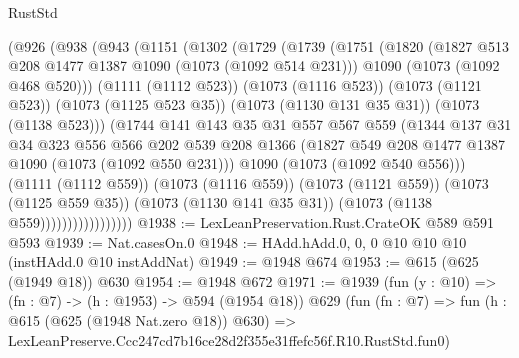 \begin{lexlean}{RustStd}
\begin{coremodule}
                  (@926
                    (@938
                      (@943
                        (@1151
                          (@1302
                            (@1729
                              (@1739
                                (@1751
                                  (@1820
                                    (@1827 @513 @208 @1477 @1387 @1090 (@1073 (@1092 @514 @231)))
                                    @1090
                                    (@1073 (@1092 @468 @520)))
                                  (@1111 (@1112 @523))
                                  (@1073 (@1116 @523))
                                  (@1073 (@1121 @523))
                                  (@1073 (@1125 @523 @35))
                                  (@1073 (@1130 @131 @35 @31))
                                  (@1073 (@1138 @523)))
                                (@1744
                                  @141
                                  @143
                                  @35
                                  @31
                                  @557
                                  @567
                                  @559
                                  (@1344
                                    @137
                                    @31
                                    @34
                                    @323
                                    @556
                                    @566
                                    @202
                                    @539
                                    @208
                                    @1366
                                    (@1827 @549 @208 @1477 @1387 @1090 (@1073 (@1092 @550 @231)))
                                    @1090
                                    (@1073 (@1092 @540 @556)))
                                  (@1111 (@1112 @559))
                                  (@1073 (@1116 @559))
                                  (@1073 (@1121 @559))
                                  (@1073 (@1125 @559 @35))
                                  (@1073 (@1130 @141 @35 @31))
                                  (@1073 (@1138 @559)))))))))))))))))
@1938 := LexLeanPreservation.Rust.CrateOK @589 @591 @593
@1939 := Nat.casesOn.{0}
@1948 := HAdd.hAdd.{0, 0, 0} @10 @10 @10 (instHAdd.{0} @10 instAddNat)
@1949 := @1948 @674
@1953 := @615 (@625 (@1949 @18)) @630
@1954 := @1948 @672
@1971 := @1939
    (fun (y : @10) => (fn : @7) -> (h : @1953) -> @594 (@1954 @18))
    @629
    (fun (fn : @7) =>
    fun (h : @615 (@625 (@1948 Nat.zero @18)) @630) =>
    LexLeanPreserve.Ccc247cd7b16ce28d2f355e31ffefc56f.R10.RustStd.fun0)

\end{coremodule}
\end{lexlean}
